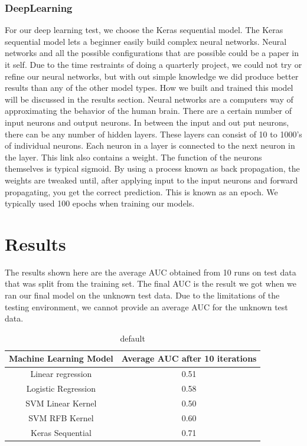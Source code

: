 \documentclass[sigconf]{acmart}
\begin{document}
\subsubsection{DeepLearning}
For our deep learning test, we choose the Keras sequential model. The Keras sequential model lets a beginner easily build complex neural networks. Neural networks and all the possible configurations that are possible could be a paper in it self. Due to the time restraints of doing a quarterly project, we could not try or refine our neural networks, but with out simple knowledge we did produce better results than any of the other model types. How we built and trained this model will be discussed in the results section. Neural networks are a computers way of approximating the behavior of the human brain. There are a certain number of input neurons and output neurons. In between the input and out put neurons, there can be any number of hidden layers. These layers can consist of 10 to 1000’s of individual neurons. Each neuron in a layer is connected to the next neuron in the layer. This link also contains a weight. The function of the neurons themselves is typical sigmoid. By using a process known as back propagation, the weights are tweaked until, after applying input to the input neurons and forward propagating, you get the correct prediction. This is known as an epoch. We typically used 100 epochs when training our models.
\section{Results}
The results shown here are the average AUC obtained from 10 runs on test data that was split from the training set. The final AUC is the result we got when we ran our final model on the unknown test data. Due to the limitations of the testing environment, we cannot provide an average AUC for the unknown test data.

\begin{table}[htp]
\caption{default}
\begin{center}
\begin{tabular}{|c|c|}
\hline
Machine Learning Model & Average AUC after 10 iterations \\
\hline\hline
Linear regression & 0.51 \\ 
Logistic Regression & 0.58 \\
SVM Linear Kernel & 0.50 \\
SVM RFB Kernel & 0.60 \\
Keras Sequential & 0.71 \\
\hline
\end{tabular}
\end{center}
\label{default}
\end{table}
\end{document}
